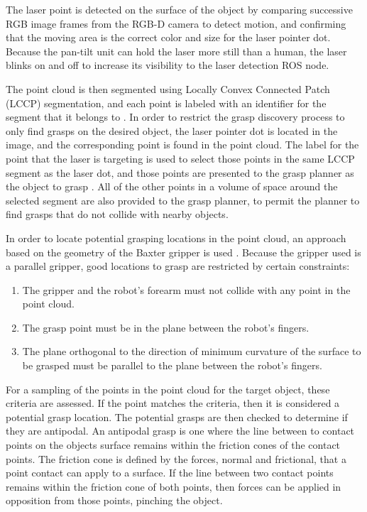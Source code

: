 \documentclass[letterpaper, 10 pt, conference]{ieeeconf}
\begin{document}
The laser point is detected on the surface of the object by comparing successive RGB image frames from the RGB-D camera to detect motion, and confirming that the moving area is the correct color and size for the laser pointer dot. 
Because the pan-tilt unit can hold the laser more still than a human, the laser blinks on and off to increase its visibility to the laser detection ROS node. 

The point cloud is then segmented using Locally Convex Connected Patch (LCCP) segmentation, and each point is labeled with an identifier for the segment that it belongs to \cite{stein2014object}. 
In order to restrict the grasp discovery process to only find grasps on the desired object, the laser pointer dot is located in the image, and the corresponding point is found in the point cloud. 
The label for the point that the laser is targeting is used to select those points in the same LCCP segment as the laser dot, and those points are presented to the grasp planner as the object to grasp \cite{stein2014object}. 
All of the other points in a volume of space around the selected segment are also provided to the grasp planner, to permit the planner to find grasps that do not collide with nearby objects. 

In order to locate potential grasping locations in the point cloud, an approach based on the geometry of the Baxter gripper is used \cite{tenusing}. 
Because the gripper used is a parallel gripper, good locations to grasp are restricted by certain constraints:
\begin{enumerate}
  \item The gripper and the robot's forearm must not collide with any point in the point cloud.
  \item The grasp point must be in the plane between the robot's fingers.
  \item The plane orthogonal to the direction of minimum curvature of the surface to be grasped must be parallel to the plane between the robot's fingers. 
\end{enumerate}

For a sampling of the points in the point cloud for the target object, these criteria are assessed. 
If the point matches the criteria, then it is considered a potential grasp location. 
The potential grasps are then checked to determine if they are antipodal. 
An antipodal grasp is one where the line between to contact points on the objects surface remains within the friction cones of the contact points. 
The friction cone is defined by the forces, normal and frictional, that a point contact can apply to a surface. 
If the line between two contact points remains within the friction cone of both points, then forces can be applied in opposition from those points, pinching the object. 
\end{document}
